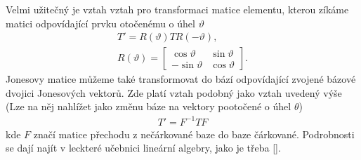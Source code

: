 Velmi užitečný je vztah vztah pro transformaci matice elementu, kterou zíkáme matici odpovídající prvku otočenému o úhel $\vartheta$
\begin{eqnarray}
T'=R(\vartheta)TR(-\vartheta), \\
R(\vartheta) = \begin{bmatrix} \cos\vartheta & \sin\vartheta \\ -\sin\vartheta & \cos\vartheta \end{bmatrix}.
\end{eqnarray}
Jonesovy matice můžeme také transformovat do bází odpovídající zvojené bázové dvojici Jonesových vektorů. Zde platí vztah podobný jako vztah uvedený výše (Lze na něj nahlížet jako změnu báze na vektory pootočené o úhel $\theta$)
\begin{eqnarray}
T'=F^{-1}TF
\end{eqnarray}
kde $F$ značí matice přechodu z nečárkované baze do baze čárkované. Podrobnosti se dají najít v leckteré učebnici lineární algebry, jako je třeba [\cite{Lingebra}].

